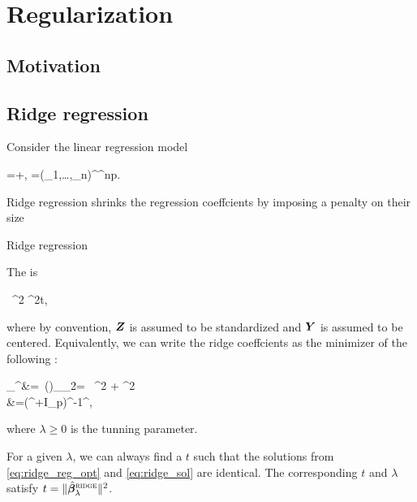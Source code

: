 \documentclass[10pt,a4paper]{book}
\begin{document}
\section{Regularization}\label{sec:regularization}
\subsection{Motivation}
\subsection{Ridge regression}\label{sec:ridge_reg}
Consider the linear regression model 
\begin{sequation*}
	\Y=\X\bab+\bave, \qquad \X=(\x_1,\ldots,\x_n)^\TT\in\bbR^{n\times p}.
\end{sequation*} 
Ridge regression shrinks the regression coeffcients by imposing a penalty on their size
\begin{defbox}{Ridge regression}
	\begin{definition}\label{def:ridge_reg}
		The  is 
		\begin{sequation}\label{eq:ridge_reg_opt}
			 \ \norm{\Y-\X\bab}^2 \qquad {} \qquad \norm{\bab}^2\leq t,
		\end{sequation}where by convention, ${\boldsymbol Z}$ is assumed to be standardized and ${\boldsymbol Y}$ is assumed to be centered.
		Equivalently, we can write the ridge coeffcients as the minimizer of the following :
		\begin{sequation}\label{eq:ridge_sol}
			\begin{aligned}
				\hat{\bab}_{\lambda}^{\ridge}&=\ \PRSS(\bab)_{\ell_2}=\argmin{\bab\in\bbR^p} \ 
			\norm{\Y-\X\bab}^2 + \lambda\norm{\bab}^2 \\
			&=(\X^\TT\X+\lambda I_p)^{-1}\X^\TT\Y,
			\end{aligned}
		\end{sequation}
		where $\lambda\geq 0$ is the tunning parameter. 
	\end{definition}
\end{defbox}
For a given $\lambda$, we can always find a $t$ such that the solutions from \eqref{eq:ridge_reg_opt} and \eqref{eq:ridge_sol} are identical. 
The corresponding $t$ and $\lambda$ satisfy $t=\lVert\hat{{\boldsymbol\beta}}_{\lambda}^{\textsc{ridge}}\rVert^2$.   
\end{document}
